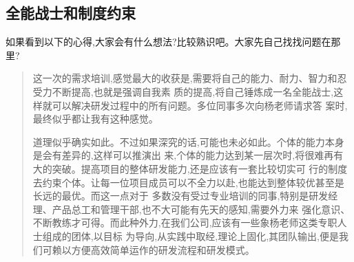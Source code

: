 \documentclass[11pt]{article}
\begin{document}
\begin{comment}
  我的习惯是,重点不是``未基线''而是``配置项''(这个概念要抓紧!)。不是配置项,它的变更是不受控的。
  但是未基线的配置项,如果需要修改,还是需要记录在CQ单里。

  这个当然是需求变更导致的。举一个例,第一个版本的需求,需要加一个功能,导致要改一些模块的接口。其中
  有一个模块还没有开发完成,还没有``基线''。

  我还是会提一个子CQ单,到这个没有基线的模块名义上,和这个需求的父CQ单关联起来。

  处理这个模块的人,看到这个CQ之后,肯定不会先基线旧接口,再用这个子CQ单基线新接口。我鼓励第一次基线
  一个工作产品,都有一个CQ单。你们是这样做么?如果是,处理上面的例子,通常都是,工作产品第一次基
  线,已经包含了那个子CQ单。然后,他就会在那个子CQ单里记录了``已经包括在某某号CQ单里处理。'',并且在
  子CQ单里,填报做这个新接口的额外工作量,作为返工工作量。然后就可以两个CQ单一齐关闭了。

  填报额外工作量时,是比较从现在开始,如果没有这个子CQ单的工作量(估算的),和有了这个子CQ单的工作
  量(实际的)。
\end{comment}

\subsection{全能战士和制度约束}
\begin{statement}

如果看到以下的心得,大家会有什么想法?比较熟识吧。大家先自己找找问题在那里?

\begin{quote}
  这一次的需求培训,感觉最大的收获是,需要将自己的能力、耐力、智力和忍受力不断提高,也就是强调自我素
  质的提高,将自己锤炼成一名全能战士,这样就可以解决研发过程中的所有问题。多位同事多次向杨老师请求答
  案时,最终似乎都让我有这种感觉。

  道理似乎确实如此。不过如果深究的话,可能也未必如此。个体的能力本身是会有差异的,这样可以推演出
  来,个体的能力达到某一层次时,将很难再有大的突破。提高项目的整体研发能力,还是应该有一套比较切实可
  行的制度去约束个体。让每一位项目成员可以不全力以赴,也能达到整体较优甚至是长远的最优。而这一点对于
  多数没有受过专业培训的同事,特别是研发经理、产品总工和管理干部,也不大可能有先天的感知,需要外力来
  强化意识、不断教练才可得。而此种外力,在我们公司,应该有一些象杨老师这类专职人士组成的团体,以目标
  为导向,从实践中取经,理论上固化,其团队输出,便是我们可赖以方便高效简单运作的研发流程和研发模式。
\end{quote}

\end{statement}
\end{document}
